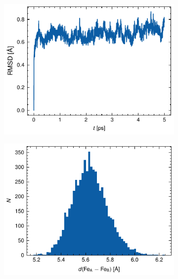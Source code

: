 \begin{figure}[htbp]
    \centering
    \begin{subfigure}{.49\textwidth}
        \centering
        \includegraphics[width=\textwidth]{Figures/B_rmsd.pdf}
    \end{subfigure}
    \begin{subfigure}{.49\textwidth}
        \centering
        \includegraphics[width=\textwidth]{Figures/B_fe-fe_hist.pdf}
    \end{subfigure}
    \par\bigskip
    \begin{subfigure}{.49\textwidth}
        \centering

\end{subfigure}
\end{figure}
